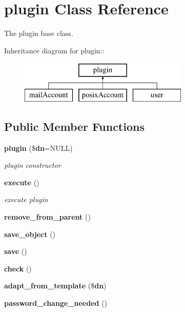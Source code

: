 \section{plugin Class Reference}
\label{classplugin}
The plugin base class.  


Inheritance diagram for plugin::\begin{figure}[H]
\begin{center}
\leavevmode
\includegraphics[height=2cm]{classplugin}
\end{center}
\end{figure}
\subsection*{Public Member Functions}
\begin{CompactItemize}
\item 
{\bf plugin} (\${\bf dn}=NULL)
\begin{CompactList}\small\item\em plugin constructor \item\end{CompactList}\item 
{\bf execute} ()
\begin{CompactList}\small\item\em execute plugin \item\end{CompactList}\item 
{\bf remove\_\-from\_\-parent} ()\label{classplugin_a2}

\item 
{\bf save\_\-object} ()\label{classplugin_a3}

\item 
{\bf save} ()\label{classplugin_a4}

\item 
{\bf check} ()\label{classplugin_a5}

\item 
{\bf adapt\_\-from\_\-template} (\${\bf dn})\label{classplugin_a6}

\item 
{\bf password\_\-change\_\-needed} ()\label{classplugin_a7}

\end{CompactItemize}
